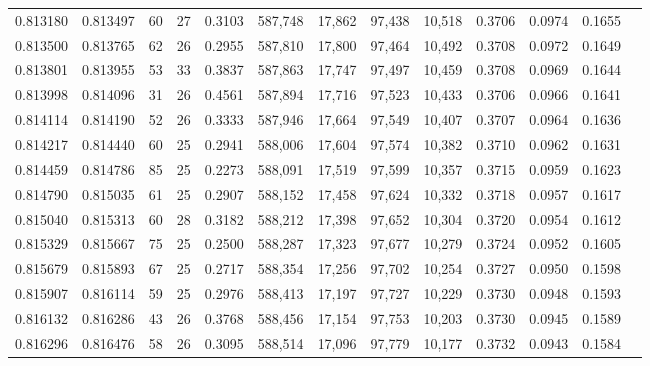 \begin{tabular}{rrrrrrrrrrrrr}
0.813180 & 0.813497 &    60 &  27 &                                     0.3103 & 587,748 &  17,862 &  97,438 &  10,518 & 0.3706 & 0.0974 & 0.1655 \\
0.813500 & 0.813765 &    62 &  26 &                                     0.2955 & 587,810 &  17,800 &  97,464 &  10,492 & 0.3708 & 0.0972 & 0.1649 \\
0.813801 & 0.813955 &    53 &  33 &                                     0.3837 & 587,863 &  17,747 &  97,497 &  10,459 & 0.3708 & 0.0969 & 0.1644 \\
0.813998 & 0.814096 &    31 &  26 &                                     0.4561 & 587,894 &  17,716 &  97,523 &  10,433 & 0.3706 & 0.0966 & 0.1641 \\
0.814114 & 0.814190 &    52 &  26 &                                     0.3333 & 587,946 &  17,664 &  97,549 &  10,407 & 0.3707 & 0.0964 & 0.1636 \\
0.814217 & 0.814440 &    60 &  25 &                                     0.2941 & 588,006 &  17,604 &  97,574 &  10,382 & 0.3710 & 0.0962 & 0.1631 \\
0.814459 & 0.814786 &    85 &  25 &                                     0.2273 & 588,091 &  17,519 &  97,599 &  10,357 & 0.3715 & 0.0959 & 0.1623 \\
0.814790 & 0.815035 &    61 &  25 &                                     0.2907 & 588,152 &  17,458 &  97,624 &  10,332 & 0.3718 & 0.0957 & 0.1617 \\
0.815040 & 0.815313 &    60 &  28 &                                     0.3182 & 588,212 &  17,398 &  97,652 &  10,304 & 0.3720 & 0.0954 & 0.1612 \\
0.815329 & 0.815667 &    75 &  25 &                                     0.2500 & 588,287 &  17,323 &  97,677 &  10,279 & 0.3724 & 0.0952 & 0.1605 \\
0.815679 & 0.815893 &    67 &  25 &                                     0.2717 & 588,354 &  17,256 &  97,702 &  10,254 & 0.3727 & 0.0950 & 0.1598 \\
0.815907 & 0.816114 &    59 &  25 &                                     0.2976 & 588,413 &  17,197 &  97,727 &  10,229 & 0.3730 & 0.0948 & 0.1593 \\
0.816132 & 0.816286 &    43 &  26 &                                     0.3768 & 588,456 &  17,154 &  97,753 &  10,203 & 0.3730 & 0.0945 & 0.1589 \\
0.816296 & 0.816476 &    58 &  26 &                                     0.3095 & 588,514 &  17,096 &  97,779 &  10,177 & 0.3732 & 0.0943 & 0.1584 \\

\end{tabular}
